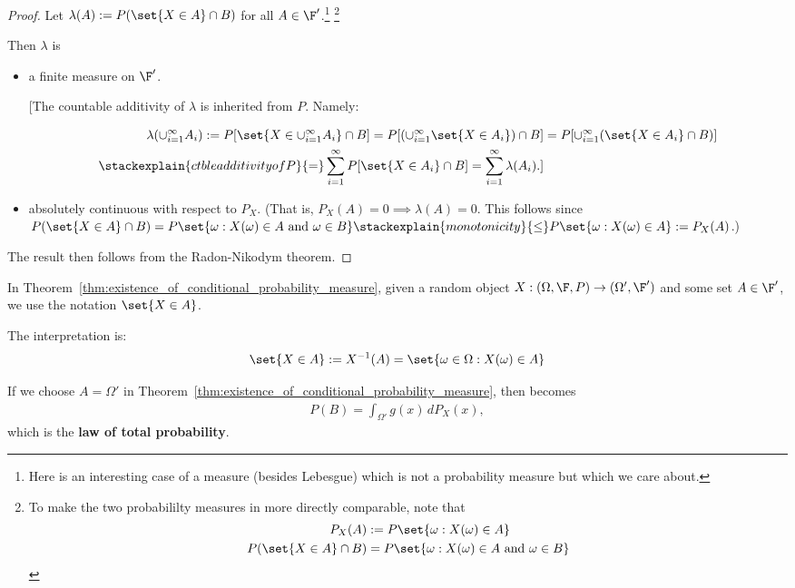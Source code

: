 \documentclass{article} %
\begin{document}
\begin{proof}
Let $\lambda(A) := 	P( \set{X \in A} \cap B) $ for all $A \in \F'$.\footnote{Here is an interesting case of a measure (besides Lebesgue) which is not a probability measure but which we care about.} \footnote{To make the two probabililty measures in  more directly comparable, note that
\begin{align*}
P_X(A) & := P\set{\omega : X(\omega) \in A} \\
P(\set{X \in A} \cap B ) &= P\set{\omega : X(\omega) \in A \text{ and } \omega \in B} 
\end{align*}}  

Then $\lambda$ is
\begin{itemize}
\item a finite measure on $\F'$.  {\scriptsize [The countable additivity of $\lambda$ is inherited from $P$.   Namely:

\begin{align*}
\lambda(\cup_{i=1}^\infty A_i) := P[\set{X \in \cup_{i=1}^\infty A_i} \cap B]= P[(\cup_{i=1}^\infty \set{X \in  A_i}) \cap B]&=  P[ \cup_{i=1}^\infty (\set{X \in  A_i} \cap B)] \\
\stackexplain{ctble additivity of P}{=} \sum_{i=1}^\infty P[\set{X \in  A_i} \cap B] = \sum_{i=1}^\infty \lambda(A_i).]
\end{align*} }
\item absolutely continuous with respect to $P_X$. {\scriptsize (That is, $P_X(A) =0 \implies \lambda(A)=0$.   This follows since $P(\set{X \in A} \cap B ) =  P\set{\omega : X(\omega) \in A \text{ and } \omega \in B} 
  \stackexplain{monotonicity}{\leq} P\set{\omega : X(\omega) \in A} := P_X(A)$.)} 
\end{itemize}
The result then follows from the Radon-Nikodym theorem.
\end{proof}

\begin{notation}
In Theorem~\ref{thm:existence_of_conditional_probability_measure}, given a random object $X:(\Omega, \F, P) \to (\Omega', \F')$ and some set $A \in \F'$, we use the notation $\set{X \in A}$. 

The interpretation is:
\[ \set{X \in A} := X^{-1}(A) = \set{\omega \in \Omega : X(\omega) \in A}\]	
\end{notation}


\begin{remark}
If we choose $A = \Omega'$ in Theorem~\ref{thm:existence_of_conditional_probability_measure}, then  becomes
\begin{align}
P(B) = \int_{\Omega'} g(x) \, dP_X(x),	
\end{align}
which is the \textbf{law of total probability}.
\end{remark}
\end{document}
